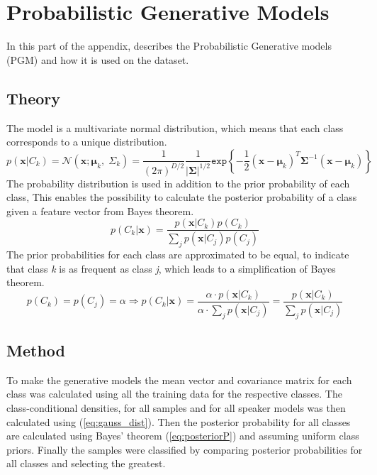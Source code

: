 \chapter{Probabilistic Generative Models}
In this part of the appendix, describes the Probabilistic Generative models (PGM) and how it is used on the dataset.

\section{Theory} 
The model is a multivariate normal distribution, which means that each class corresponds to a unique distribution.
\begin{equation}
p(\mathbf{x}|C_k)=
\mathcal{N}(\mathbf{x};\mathbf{\mu}_k, \; \Sigma_k) =
 \dfrac{1}{(2\pi)^{D/2}} \dfrac{1}{\left|\mathbf{\Sigma} \right|^{1/2}} 
 \mathtt{exp} \left\lbrace -\dfrac{1}{2} (\mathbf{x}-\mathbf{\mu}_k)^T \mathbf{\Sigma}^{-1} (\mathbf{x}-\mathbf{\mu}_k) \right\rbrace
\label{eq:gauss_dist} 
\end{equation}
The probability distribution is used in addition to the prior probability of each class, This enables the possibility to calculate the posterior probability of a class given a feature vector from Bayes theorem.
\begin{equation}
p(C_k |\mathbf{x}) =
\dfrac{p(\mathbf{x}|C_k) p(C_k)}
{\sum_j p(\mathbf{x}|C_j) p(C_j)}
\label{eq:posteriorP}
\end{equation}
The prior probabilities for each class are approximated to be equal, to indicate that class \textit{k} is as frequent as class \textit{j}, which leads to a simplification of Bayes theorem.
\begin{equation}
p(C_k) = p(C_j) = \alpha \Longrightarrow p(C_k |\mathbf{x}) = 
\dfrac
{\alpha \cdot p(\mathbf{x}|C_k) }
{\alpha \cdot \sum_j p(\mathbf{x}|C_j) } = 
\dfrac{p(\mathbf{x}|C_k)}
{\sum_j p(\mathbf{x}|C_j)}
\label{eq:posteriorPsimple}
\end{equation}



\section{Method}
To make the generative models the mean vector and covariance matrix for each class was calculated using all the training data for the respective classes.
The class-conditional densities, for all samples and for all speaker models was then calculated using (\ref{eq:gauss_dist}).
Then the posterior probability for all classes are calculated using Bayes' theorem (\ref{eq:posteriorP}) and assuming uniform class priors.
Finally the samples were classified by comparing posterior probabilities for all classes and selecting the greatest.





